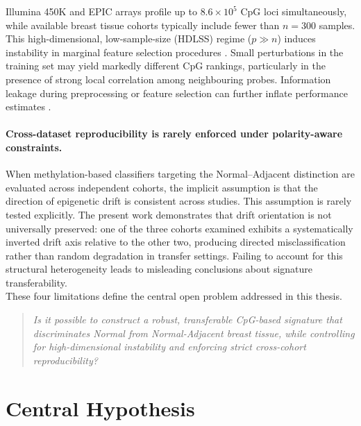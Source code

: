 Illumina 450K and EPIC arrays profile up to $8.6 \times 10^5$
CpG loci simultaneously, while available breast tissue
cohorts typically include fewer than $n=300$ samples.
This high-dimensional, low-sample-size (HDLSS) regime
($p \gg n$) induces instability in marginal feature selection
procedures \cite{Meinshausen2010}.
Small perturbations in the training set may yield markedly
different CpG rankings, particularly in the presence of
strong local correlation among neighbouring probes.
Information leakage during preprocessing or feature
selection can further inflate performance estimates
\cite{Ambroise2002}.

\paragraph{Cross-dataset reproducibility is rarely enforced
under polarity-aware constraints.}

When methylation-based classifiers targeting the
Normal--Adjacent distinction are evaluated across
independent cohorts, the implicit assumption is that
the direction of epigenetic drift is consistent across
studies.
This assumption is rarely tested explicitly.
The present work demonstrates that drift orientation
is not universally preserved: one of the three cohorts
examined exhibits a systematically inverted drift axis
relative to the other two, producing directed
misclassification rather than random degradation
in transfer settings.
Failing to account for this structural heterogeneity
leads to misleading conclusions about signature
transferability.\\



\noindent These four limitations define the central open problem
addressed in this thesis.

\begin{quote}
\textit{Is it possible to construct a robust, transferable
CpG-based signature that discriminates Normal from
Normal-Adjacent breast tissue, while controlling for
high-dimensional instability and enforcing strict
cross-cohort reproducibility?}
\end{quote}


\section{Central Hypothesis}
 
